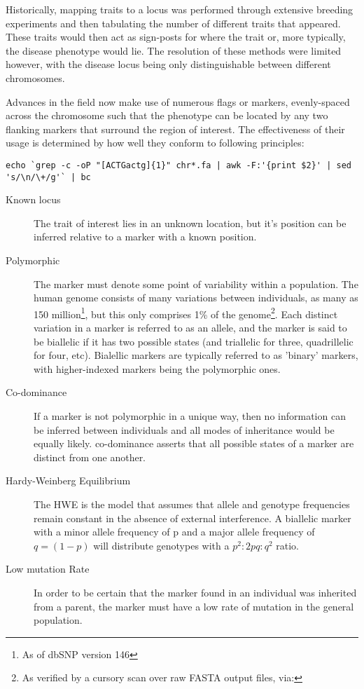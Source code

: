 Historically, mapping traits to a locus was performed through extensive breeding experiments and then tabulating the number of different traits that appeared. These traits would then act as sign-posts for where the trait or, more typically, the disease phenotype would lie. The resolution of these methods were limited however, with the disease locus being only distinguishable between different chromosomes.

Advances in the field now make use of numerous flags or \gls{markers}, evenly-spaced across the chromosome such that the phenotype can be located by any two flanking markers that surround the region of interest. The effectiveness of their usage  is determined by how well they conform to following principles:

\begin{lrbox}\myVerb\scriptsize
    \verb!echo `grep -c -oP "[ACTGactg]{1}" chr*.fa | awk -F:'{print $2}' | sed 's/\n/\+/g'` | bc!
\end{lrbox}%

\begin{description}
\item[Known locus]{
	The trait of interest lies in an unknown location, but it's position can be inferred relative to a marker with a known position.
}
\item[Polymorphic]
{
	The marker must denote some point of variability within a population. The human genome consists of many variations between individuals, as many as 150 million\footnote{As of dbSNP version 146}, but this only comprises 1\% of the genome\footnote{As verified by a cursory scan over raw FASTA output files, via: \usebox\myVerb}. Each distinct variation in a marker is referred to as an allele, and the marker is said to be \gls{biallelic} if it has two possible states (and triallelic for three, quadrillelic for four, etc). Bialellic markers are typically referred to as 'binary' markers, with higher-indexed markers being the \gls{polymorphic} ones.
}
\item[Co-dominance]{If a marker is not polymorphic in a unique way, then no information can be inferred between individuals and all modes of inheritance would be equally likely.  \gls{co-dominance} asserts that all possible states of a marker are distinct from one another.}
\item[Hardy-Weinberg Equilibrium]{The \gls{HWE} is the model that assumes that allele and genotype frequencies remain constant in the absence of external interference. A biallelic marker with a minor allele frequency of p and a major allele frequency of \(q = (1-p)\) will distribute genotypes with a \(p^2 : 2pq : q^2\) ratio.}
\item[Low mutation Rate]{In order to be  certain that the marker found in an individual was inherited from a parent, the marker must have a low rate of mutation in the general population.}
\end{description}

